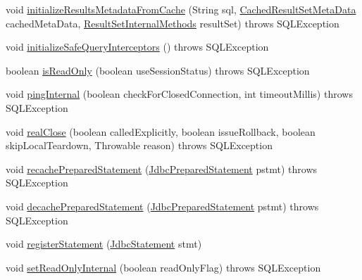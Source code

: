 \begin{DoxyCompactItemize}
\item 
void \mbox{\hyperlink{interfacecom_1_1mysql_1_1cj_1_1jdbc_1_1_jdbc_connection_adaeb33edd797d27f3836f5cab30c51d0}{initialize\+Results\+Metadata\+From\+Cache}} (String sql, \mbox{\hyperlink{interfacecom_1_1mysql_1_1cj_1_1jdbc_1_1result_1_1_cached_result_set_meta_data}{Cached\+Result\+Set\+Meta\+Data}} cached\+Meta\+Data, \mbox{\hyperlink{interfacecom_1_1mysql_1_1cj_1_1jdbc_1_1result_1_1_result_set_internal_methods}{Result\+Set\+Internal\+Methods}} result\+Set)  throws S\+Q\+L\+Exception
\item 
void \mbox{\hyperlink{interfacecom_1_1mysql_1_1cj_1_1jdbc_1_1_jdbc_connection_a48b2a3226fefc00bf09985a66da96d90}{initialize\+Safe\+Query\+Interceptors}} ()  throws S\+Q\+L\+Exception
\item 
boolean \mbox{\hyperlink{interfacecom_1_1mysql_1_1cj_1_1jdbc_1_1_jdbc_connection_ac4815b01cd9176630cbab2941bec0ce4}{is\+Read\+Only}} (boolean use\+Session\+Status)  throws S\+Q\+L\+Exception
\item 
void \mbox{\hyperlink{interfacecom_1_1mysql_1_1cj_1_1jdbc_1_1_jdbc_connection_a25615f355be83a136df2efcde168666c}{ping\+Internal}} (boolean check\+For\+Closed\+Connection, int timeout\+Millis)  throws S\+Q\+L\+Exception
\item 
void \mbox{\hyperlink{interfacecom_1_1mysql_1_1cj_1_1jdbc_1_1_jdbc_connection_af5f24cb10cfc14e0174c6bb115745bc0}{real\+Close}} (boolean called\+Explicitly, boolean issue\+Rollback, boolean skip\+Local\+Teardown, Throwable reason)  throws S\+Q\+L\+Exception
\item 
void \mbox{\hyperlink{interfacecom_1_1mysql_1_1cj_1_1jdbc_1_1_jdbc_connection_a24f00ff038a4f01aab9dea9e2817c084}{recache\+Prepared\+Statement}} (\mbox{\hyperlink{interfacecom_1_1mysql_1_1cj_1_1jdbc_1_1_jdbc_prepared_statement}{Jdbc\+Prepared\+Statement}} pstmt)  throws S\+Q\+L\+Exception
\item 
void \mbox{\hyperlink{interfacecom_1_1mysql_1_1cj_1_1jdbc_1_1_jdbc_connection_abf867252ec91eb8d6ed6ec4fb34b2686}{decache\+Prepared\+Statement}} (\mbox{\hyperlink{interfacecom_1_1mysql_1_1cj_1_1jdbc_1_1_jdbc_prepared_statement}{Jdbc\+Prepared\+Statement}} pstmt)  throws S\+Q\+L\+Exception
\item 
void \mbox{\hyperlink{interfacecom_1_1mysql_1_1cj_1_1jdbc_1_1_jdbc_connection_ae2bd1cf8c944f811560e419b9fcefc91}{register\+Statement}} (\mbox{\hyperlink{interfacecom_1_1mysql_1_1cj_1_1jdbc_1_1_jdbc_statement}{Jdbc\+Statement}} stmt)
\item 
void \mbox{\hyperlink{interfacecom_1_1mysql_1_1cj_1_1jdbc_1_1_jdbc_connection_ad105c1e8c2184531cc209ce25e7817b3}{set\+Read\+Only\+Internal}} (boolean read\+Only\+Flag)  throws S\+Q\+L\+Exception

\end{DoxyCompactItemize}
